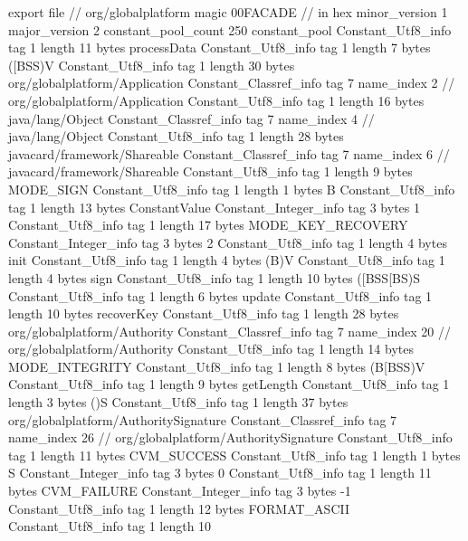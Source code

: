 export file {		// org/globalplatform
	magic	00FACADE		 // in hex
	minor_version	1
	major_version	2
	constant_pool_count	250
	constant_pool {
		Constant_Utf8_info {
			tag	1
			length	11
			bytes	processData
		}
		Constant_Utf8_info {
			tag	1
			length	7
			bytes	([BSS)V
		}
		Constant_Utf8_info {
			tag	1
			length	30
			bytes	org/globalplatform/Application
		}
		Constant_Classref_info {
			tag	7
			name_index	2		// org/globalplatform/Application
		}
		Constant_Utf8_info {
			tag	1
			length	16
			bytes	java/lang/Object
		}
		Constant_Classref_info {
			tag	7
			name_index	4		// java/lang/Object
		}
		Constant_Utf8_info {
			tag	1
			length	28
			bytes	javacard/framework/Shareable
		}
		Constant_Classref_info {
			tag	7
			name_index	6		// javacard/framework/Shareable
		}
		Constant_Utf8_info {
			tag	1
			length	9
			bytes	MODE_SIGN
		}
		Constant_Utf8_info {
			tag	1
			length	1
			bytes	B
		}
		Constant_Utf8_info {
			tag	1
			length	13
			bytes	ConstantValue
		}
		Constant_Integer_info {
			tag	3
			bytes	1
		}
		Constant_Utf8_info {
			tag	1
			length	17
			bytes	MODE_KEY_RECOVERY
		}
		Constant_Integer_info {
			tag	3
			bytes	2
		}
		Constant_Utf8_info {
			tag	1
			length	4
			bytes	init
		}
		Constant_Utf8_info {
			tag	1
			length	4
			bytes	(B)V
		}
		Constant_Utf8_info {
			tag	1
			length	4
			bytes	sign
		}
		Constant_Utf8_info {
			tag	1
			length	10
			bytes	([BSS[BS)S
		}
		Constant_Utf8_info {
			tag	1
			length	6
			bytes	update
		}
		Constant_Utf8_info {
			tag	1
			length	10
			bytes	recoverKey
		}
		Constant_Utf8_info {
			tag	1
			length	28
			bytes	org/globalplatform/Authority
		}
		Constant_Classref_info {
			tag	7
			name_index	20		// org/globalplatform/Authority
		}
		Constant_Utf8_info {
			tag	1
			length	14
			bytes	MODE_INTEGRITY
		}
		Constant_Utf8_info {
			tag	1
			length	8
			bytes	(B[BSS)V
		}
		Constant_Utf8_info {
			tag	1
			length	9
			bytes	getLength
		}
		Constant_Utf8_info {
			tag	1
			length	3
			bytes	()S
		}
		Constant_Utf8_info {
			tag	1
			length	37
			bytes	org/globalplatform/AuthoritySignature
		}
		Constant_Classref_info {
			tag	7
			name_index	26		// org/globalplatform/AuthoritySignature
		}
		Constant_Utf8_info {
			tag	1
			length	11
			bytes	CVM_SUCCESS
		}
		Constant_Utf8_info {
			tag	1
			length	1
			bytes	S
		}
		Constant_Integer_info {
			tag	3
			bytes	0
		}
		Constant_Utf8_info {
			tag	1
			length	11
			bytes	CVM_FAILURE
		}
		Constant_Integer_info {
			tag	3
			bytes	-1
		}
		Constant_Utf8_info {
			tag	1
			length	12
			bytes	FORMAT_ASCII
		}
		Constant_Utf8_info {
			tag	1
			length	10
}}}
